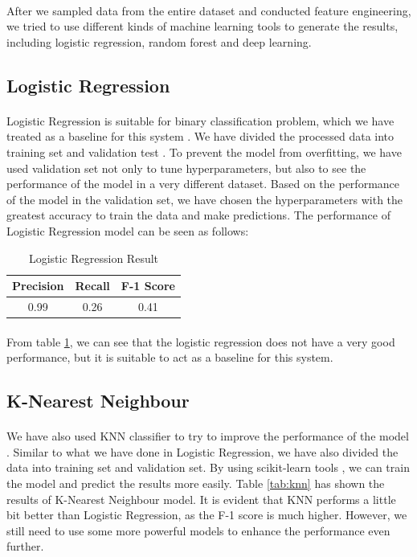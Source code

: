 \documentclass[fleqn,11pt]{olplainarticle}
\begin{document}
\paragraph*{}
After we sampled data from the entire dataset and conducted feature engineering, we tried to use different kinds of machine learning tools to generate the results, including logistic regression, random forest and deep learning.

\subsection{Logistic Regression}\label{lr}
\paragraph*{}
Logistic Regression is suitable for binary classification problem, which we have treated as a baseline for this system \citep{menard_lr}. We have divided the processed data into training set and validation test \citep{scikit-learn}. To prevent the model from overfitting, we have used validation set not only to tune hyperparameters, but also to see the performance of the model in a very different dataset. Based on the performance of the model in the validation set, we have chosen the hyperparameters with the greatest accuracy to train the data and make predictions. The performance of Logistic Regression model can be seen as follows:

\begin{table}[!htbp]
\centering
\caption{Logistic Regression Result}\label{tab:lr}
\begin{tabular}{ccc}
\toprule
Precision& Recall& F-1 Score\\
\midrule
0.99& 0.26& 0.41\\
\bottomrule
\end{tabular}
\end{table}
\paragraph*{}
From table \ref{tab:lr}, we can see that the logistic regression does not have a very good performance, but it is suitable to act as a baseline for this system.

\subsection{K-Nearest Neighbour}\label{knn}
\paragraph*{}
We have also used KNN classifier to try to improve the performance of the model \citep{Rebala2019}. Similar to what we have done in Logistic Regression, we have also divided the data into training set and validation set. By using scikit-learn tools \citep{scikit-learn}, we can train the model and predict the results more easily. Table \ref{tab:knn} has shown the results of K-Nearest Neighbour model. It is evident that KNN performs a little bit better than Logistic Regression, as the F-1 score is much higher. However, we still need to use some more powerful models to enhance the performance even further.
\end{document}
